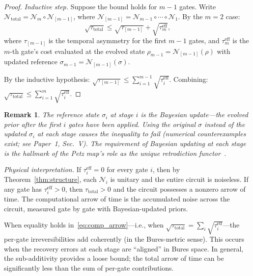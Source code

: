 \documentclass[prl,twocolumn,superscriptaddress,longbibliography]{revtex4-2}
\newtheorem*{remark}{Remark}
\newcommand{\chan}{\mathcal{N}}
\newcommand{\tauasym}{\tau}
\begin{document}
\begin{proof}
\emph{Inductive step.}
Suppose the bound holds for $m-1$ gates.  Write
$\chan_{\mathrm{total}} = \chan_m \circ \chan_{[m-1]}$, where
$\chan_{[m-1]} = \chan_{m-1} \circ \cdots \circ \chan_1$.
By the $m = 2$ case:
\begin{equation}
\sqrt{\tauasym_{\mathrm{total}}} \leq
\sqrt{\tauasym_{[m-1]}} + \sqrt{\tauasym_m^{\mathrm{eff}}},
\end{equation}
where $\tauasym_{[m-1]}$ is the temporal asymmetry for the
first $m-1$ gates, and $\tauasym_m^{\mathrm{eff}}$ is the
$m$-th gate's cost evaluated at the evolved state
$\rho_{m-1} = \chan_{[m-1]}(\rho)$ with updated reference
$\sigma_{m-1} = \chan_{[m-1]}(\sigma)$.

By the inductive hypothesis:
$\sqrt{\tauasym_{[m-1]}} \leq \sum_{i=1}^{m-1}
\sqrt{\tauasym_i^{\mathrm{eff}}}$.
Combining:
$\sqrt{\tauasym_{\mathrm{total}}} \leq
\sum_{i=1}^{m} \sqrt{\tauasym_i^{\mathrm{eff}}}$.
\end{proof}

\begin{remark}
The reference state $\sigma_i$ at stage $i$ is the
\emph{Bayesian update}---the evolved prior after the first $i$ gates
have been applied.  Using the original $\sigma$ instead of the
updated $\sigma_i$ at each stage causes the inequality to fail
(numerical counterexamples exist; see Paper~1, Sec.~V).  The
requirement of Bayesian updating at each stage is the hallmark
of the Petz map's role as the unique retrodiction
functor~\cite{Parzygnat2023}.
\end{remark}

\emph{Physical interpretation.}
If $\tauasym_i^{\mathrm{eff}} = 0$ for every gate $i$, then by
Theorem~\ref{thm:structure}, each $\chan_i$ is unitary and the
entire circuit is noiseless.  If any gate has
$\tauasym_i^{\mathrm{eff}} > 0$, then $\tauasym_{\mathrm{total}} > 0$
and the circuit possesses a nonzero arrow of time.  The computational
arrow of time is the accumulated noise across the circuit, measured
gate by gate with Bayesian-updated priors.

When equality holds in~\eqref{eq:comp_arrow}---i.e., when
$\sqrt{\tauasym_{\mathrm{total}}} = \sum_i \sqrt{\tauasym_i^{\mathrm{eff}}}$---the
per-gate irreversibilities add coherently (in the Bures-metric sense).
This occurs when the recovery errors at each stage are
``aligned'' in Bures space.  In general, the sub-additivity
provides a loose bound; the total arrow of time can be significantly
less than the sum of per-gate contributions.
\end{document}
